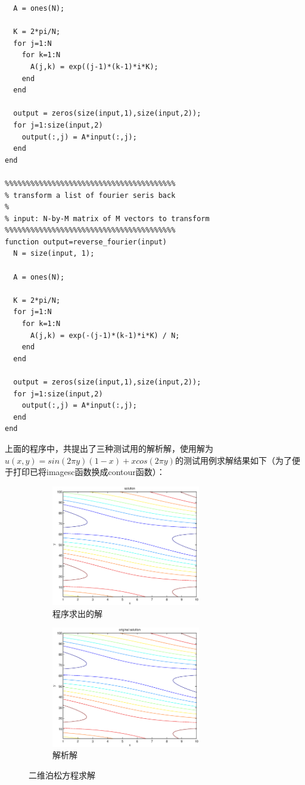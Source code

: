 \documentclass[paper=a4, fontsize=11pt]{scrartcl} %
\numberwithin{equation}{section} %
\numberwithin{figure}{section} %
\numberwithin{table}{section} %
\begin{document}
\begin{CJK*}{UTF8}{gbsn}
\begin{lstlisting}
  A = ones(N);

  K = 2*pi/N;
  for j=1:N
    for k=1:N
      A(j,k) = exp((j-1)*(k-1)*i*K);
    end
  end

  output = zeros(size(input,1),size(input,2));
  for j=1:size(input,2)
    output(:,j) = A*input(:,j);
  end
end

%%%%%%%%%%%%%%%%%%%%%%%%%%%%%%%%%%%%%%%%
% transform a list of fourier seris back
%
% input: N-by-M matrix of M vectors to transform
%%%%%%%%%%%%%%%%%%%%%%%%%%%%%%%%%%%%%%%%
function output=reverse_fourier(input)
  N = size(input, 1);

  A = ones(N);

  K = 2*pi/N;
  for j=1:N
    for k=1:N
      A(j,k) = exp(-(j-1)*(k-1)*i*K) / N;
    end
  end

  output = zeros(size(input,1),size(input,2));
  for j=1:size(input,2)
    output(:,j) = A*input(:,j);
  end
end

\end{lstlisting}
上面的程序中，共提出了三种测试用的解析解，使用解为$u(x,y)=sin(2\pi y)(1-x)+ xcos(2\pi y)$的测试用例求解结果如下（为了便于打印已将imagesc函数换成contour函数）：

\begin{figure}[H]
\centering
\begin{subfigure}{70mm}
  \centering
  \includegraphics[width=65mm]{figure-2-1-1.eps}
  \caption{程序求出的解}
  \label{fig:sub1}
\end{subfigure}
\begin{subfigure}{70mm}
  \centering
  \includegraphics[width=65mm]{figure-2-1-2.eps}
  \caption{解析解}
  \label{fig:sub2}
\end{subfigure}
\caption{二维泊松方程求解}
\label{fig:test}
\end{figure}


\end{CJK*}
\end{document}
